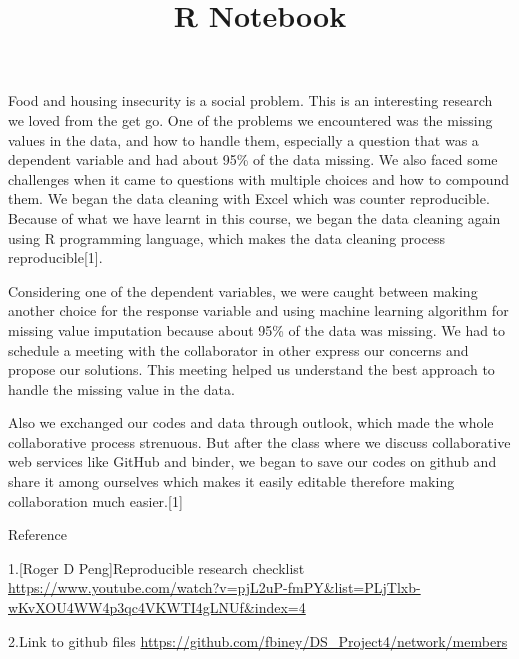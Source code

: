 \documentclass[
]{article}
\title{R Notebook}
\author{}
\date{\vspace{-2.5em}}
\begin{document}
\maketitle

Food and housing insecurity is a social problem. This is an interesting
research we loved from the get go. One of the problems we encountered
was the missing values in the data, and how to handle them, especially a
question that was a dependent variable and had about 95\% of the data
missing. We also faced some challenges when it came to questions with
multiple choices and how to compound them. We began the data cleaning
with Excel which was counter reproducible. Because of what we have
learnt in this course, we began the data cleaning again using R
programming language, which makes the data cleaning process
reproducible{[}1{]}.

Considering one of the dependent variables, we were caught between
making another choice for the response variable and using machine
learning algorithm for missing value imputation because about 95\% of
the data was missing. We had to schedule a meeting with the collaborator
in other express our concerns and propose our solutions. This meeting
helped us understand the best approach to handle the missing value in
the data.

Also we exchanged our codes and data through outlook, which made the
whole collaborative process strenuous. But after the class where we
discuss collaborative web services like GitHub and binder, we began to
save our codes on github and share it among ourselves which makes it
easily editable therefore making collaboration much easier.{[}1{]}

Reference

1.{[}Roger D Peng{]}Reproducible research checklist
\url{https://www.youtube.com/watch?v=pjL2uP-fmPY\&list=PLjTlxb-wKvXOU4WW4p3qc4VKWTI4gLNUf\&index=4}

2.Link to github files
\url{https://github.com/fbiney/DS_Project4/network/members}
\end{document}
